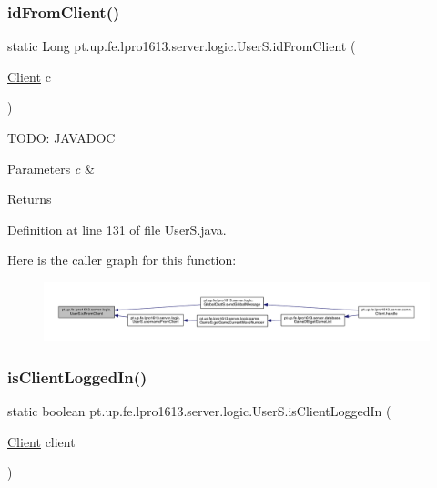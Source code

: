 \subsubsection{\texorpdfstring{id\+From\+Client()}{idFromClient()}}
{\footnotesize\ttfamily static Long pt.\+up.\+fe.\+lpro1613.\+server.\+logic.\+User\+S.\+id\+From\+Client (\begin{DoxyParamCaption}\item[{\hyperlink{classpt_1_1up_1_1fe_1_1lpro1613_1_1server_1_1conn_1_1_client}{Client}}]{c }\end{DoxyParamCaption})\hspace{0.3cm}{\ttfamily [static]}}

T\+O\+DO\+: J\+A\+V\+A\+D\+OC 
\begin{DoxyParams}{Parameters}
{\em c} & \\
\hline
\end{DoxyParams}
\begin{DoxyReturn}{Returns}

\end{DoxyReturn}


Definition at line 131 of file User\+S.\+java.

Here is the caller graph for this function\+:
\nopagebreak
\begin{figure}[H]
\begin{center}
\leavevmode
\includegraphics[width=350pt]{classpt_1_1up_1_1fe_1_1lpro1613_1_1server_1_1logic_1_1_user_s_a6ce47ad78e634c757be0ffc905799b4c_icgraph}
\end{center}
\end{figure}
\hypertarget{classpt_1_1up_1_1fe_1_1lpro1613_1_1server_1_1logic_1_1_user_s_abe3cf61bff09cb09e3ed0a5564e98257}{}\label{classpt_1_1up_1_1fe_1_1lpro1613_1_1server_1_1logic_1_1_user_s_abe3cf61bff09cb09e3ed0a5564e98257} 
\subsubsection{\texorpdfstring{is\+Client\+Logged\+In()}{isClientLoggedIn()}}
{\footnotesize\ttfamily static boolean pt.\+up.\+fe.\+lpro1613.\+server.\+logic.\+User\+S.\+is\+Client\+Logged\+In (\begin{DoxyParamCaption}\item[{\hyperlink{classpt_1_1up_1_1fe_1_1lpro1613_1_1server_1_1conn_1_1_client}{Client}}]{client }\end{DoxyParamCaption})\hspace{0.3cm}{\ttfamily [static]}}


